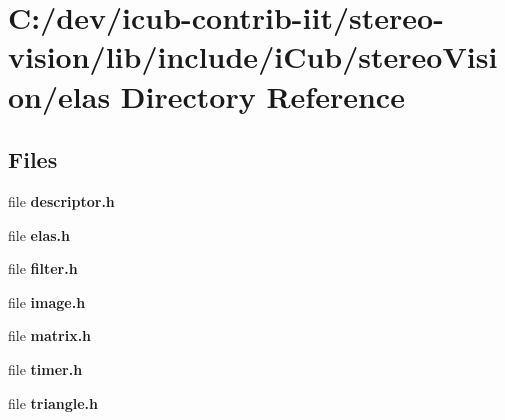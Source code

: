 \section{C\+:/dev/icub-\/contrib-\/iit/stereo-\/vision/lib/include/i\+Cub/stereo\+Vision/elas Directory Reference}
\label{dir_f53e440ea5bef4714dd0a15d20f80d76}
\subsection*{Files}
\begin{DoxyCompactItemize}
\item 
file {\bfseries descriptor.\+h}
\item 
file {\bfseries elas.\+h}
\item 
file {\bfseries filter.\+h}
\item 
file {\bfseries image.\+h}
\item 
file {\bfseries matrix.\+h}
\item 
file {\bfseries timer.\+h}
\item 
file {\bfseries triangle.\+h}
\end{DoxyCompactItemize}
